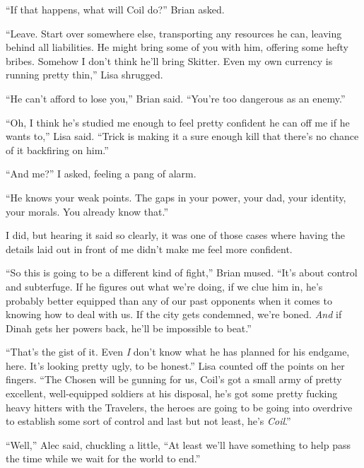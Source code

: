 ``If that happens, what will Coil do?'' Brian asked.



``Leave.  Start over somewhere else, transporting any resources he can, leaving behind all liabilities.  He might bring some of you with him, offering some hefty bribes.  Somehow I don't think he'll bring Skitter.  Even my own currency is running pretty thin,'' Lisa shrugged.



``He can't afford to lose you,'' Brian said.  ``You're too dangerous as an enemy.''



``Oh, I think he's studied me enough to feel pretty confident he can off me if he wants to,'' Lisa said. ``Trick is making it a sure enough kill that there's no chance of it backfiring on him.''



``And me?'' I asked, feeling a pang of alarm.



``He knows your weak points.  The gaps in your power, your dad, your identity, your morals.  You already know that.''



I did, but hearing it said so clearly, it was one of those cases where having the details laid out in front of me didn't make me feel more confident.



``So this is going to be a different kind of fight,'' Brian mused.  ``It's about control and subterfuge.  If he figures out what we're doing, if we clue him in, he's probably better equipped than any of our past opponents when it comes to knowing how to deal with us.  If the city gets condemned, we're boned.  \emph{And} if Dinah gets her powers back, he'll be impossible to beat.''



``That's the gist of it.  Even \emph{I} don't know what he has planned for his endgame, here.  It's looking pretty ugly, to be honest.''  Lisa counted off the points on her fingers.  ``The Chosen will be gunning for us, Coil's got a small army of pretty excellent, well-equipped soldiers at his disposal, he's got some pretty fucking heavy hitters with the Travelers, the heroes are going to be going into overdrive to establish some sort of control and last but not least, he's \emph{Coil}.''



``Well,'' Alec said, chuckling a little, ``At least we'll have something to help pass the time while we wait for the world to end.''





